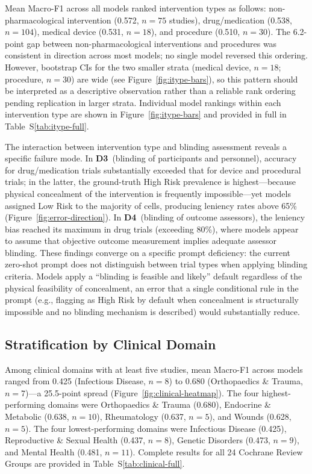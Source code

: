 \documentclass[../main.tex]{subfiles}
\begin{document}
Mean Macro-F1 across all models ranked intervention types as follows:
non-pharmacological intervention (0.572, $n = 75$ studies),
drug/medication (0.538, $n = 104$),
medical device (0.531, $n = 18$), and
procedure (0.510, $n = 30$).
The 6.2-point gap between non-pharmacological interventions and procedures was
consistent in direction across most models; no single model reversed this
ordering.
However, bootstrap CIs for the two smaller strata (medical device, $n = 18$;
procedure, $n = 30$) are wide (see Figure~\ref{fig:itype-bars}), so this
pattern should be interpreted as a descriptive observation rather than a
reliable rank ordering pending replication in larger strata.
Individual model rankings within each intervention type are shown in
Figure~\ref{fig:itype-bars} and provided in full in Table~S\ref{tab:itype-full}.

The interaction between intervention type and blinding assessment reveals a
specific failure mode.
In \textbf{D3}~(blinding of participants and personnel), accuracy for
drug/medication trials substantially exceeded that for device and procedural
trials; in the latter, the ground-truth High Risk prevalence is highest---because
physical concealment of the intervention is frequently impossible---yet models
assigned Low Risk to the majority of cells, producing leniency rates above 65\%
(Figure~\ref{fig:error-direction}).
In \textbf{D4}~(blinding of outcome assessors), the leniency bias reached its
maximum in drug trials (exceeding 80\%), where models appear to assume that
objective outcome measurement implies adequate assessor blinding.
These findings converge on a specific prompt deficiency: the current zero-shot
prompt does not distinguish between trial types when applying blinding criteria.
Models apply a ``blinding is feasible and likely'' default regardless of the
physical feasibility of concealment, an error that a single conditional rule
in the prompt (e.g., flagging as High Risk by default when concealment is
structurally impossible and no blinding mechanism is described) would
substantially reduce.

\subsection{Stratification by Clinical Domain}
\label{sec:clinical}

Among clinical domains with at least five studies, mean Macro-F1 across models
ranged from 0.425 (Infectious Disease, $n = 8$) to 0.680
(Orthopaedics \& Trauma, $n = 7$)---a 25.5-point spread
(Figure~\ref{fig:clinical-heatmap}).
The four highest-performing domains were
Orthopaedics \& Trauma (0.680),
Endocrine \& Metabolic (0.638, $n = 10$),
Rheumatology (0.637, $n = 5$), and
Wounds (0.628, $n = 5$).
The four lowest-performing domains were
Infectious Disease (0.425),
Reproductive \& Sexual Health (0.437, $n = 8$),
Genetic Disorders (0.473, $n = 9$), and
Mental Health (0.481, $n = 11$).
Complete results for all 24 Cochrane Review Groups are provided in
Table~S\ref{tab:clinical-full}.
\end{document}
